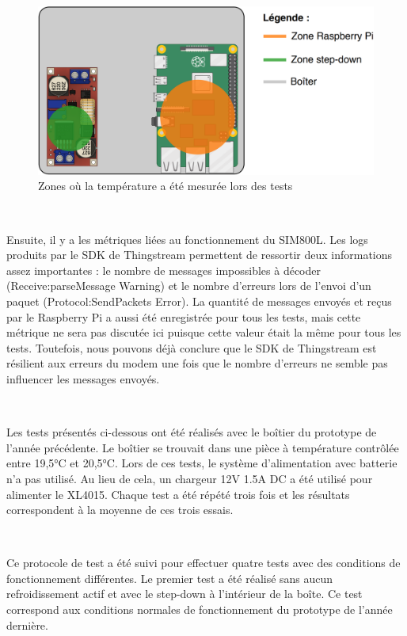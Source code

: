 \begin{figure}[ht!]
  \centering
  \includegraphics[scale=0.25]{img/el_prototype/zones_temperature.png}
  \caption{Zones où la température a été mesurée lors des tests}
  \label{fig:temp_zones}
\end{figure}

~

\noindent
Ensuite, il y a les métriques liées au fonctionnement du SIM800L.
Les logs produits par le SDK de Thingstream permettent de ressortir deux informations assez importantes : le nombre de messages impossibles à décoder (Receive:parseMessage Warning) et le nombre d'erreurs lors de l'envoi d'un paquet (Protocol:SendPackets Error). La quantité de messages envoyés et reçus par le Raspberry Pi a aussi été enregistrée pour tous les tests, mais cette métrique ne sera pas discutée ici puisque cette valeur était la même pour tous les tests. Toutefois, nous pouvons déjà conclure que le SDK de Thingstream est résilient aux erreurs du modem une fois que le nombre d'erreurs ne semble pas influencer les messages envoyés.

~


\noindent
Les tests présentés ci-dessous ont été réalisés avec le boîtier du prototype de l'année précédente. Le boîtier se trouvait dans une pièce à température contrôlée entre 19,5°C et 20,5°C. Lors de ces tests, le système d'alimentation avec batterie n'a pas utilisé. Au lieu de cela, un chargeur 12V 1.5A DC a été utilisé pour alimenter le XL4015. Chaque test a été répété trois fois et les résultats correspondent à la moyenne de ces trois essais.

~


\noindent
Ce protocole de test a été suivi pour effectuer quatre tests avec des conditions de fonctionnement différentes. Le premier test a été réalisé sans aucun refroidissement actif et avec le step-down à l'intérieur de la boîte. Ce test correspond aux conditions normales de fonctionnement du prototype de l'année dernière.



